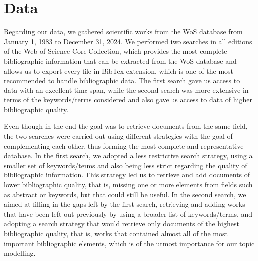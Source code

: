 \section{Data} \label{data}

Regarding our data, we gathered scientific works from the WoS database from January 1, 1983 to December 31, 2024. We performed two searches in all editions of the Web of Science Core Collection, which provides the most complete bibliographic information that can be extracted from the WoS database and allows us to export every file in BibTex extension, which is one of the most recommended to handle bibliographic data. The first search gave us access to data with an excellent time span, while the second search was more extensive in terms of the keywords/terms considered and also gave us access to data of higher bibliographic quality.

Even though in the end the goal was to retrieve documents from the same field, the two searches were carried out using different strategies with the goal of complementing each other, thus forming the most complete and representative database. In the first search, we adopted a less restrictive search strategy, using a smaller set of keywords/terms and also being less strict regarding the quality of bibliographic information. This strategy led us to retrieve and add documents of lower bibliographic quality, that is, missing one or more elements from fields such as abstract or keywords, but that could still be useful. In the second search, we aimed at filling in the gaps left by the first search, retrieving and adding works that have been left out previously by using a broader list of keywords/terms, and adopting a search strategy that would retrieve only documents of the highest bibliographic quality, that is, works that contained almost all of the most important bibliographic elements, which is of the utmost importance for our topic modelling.

